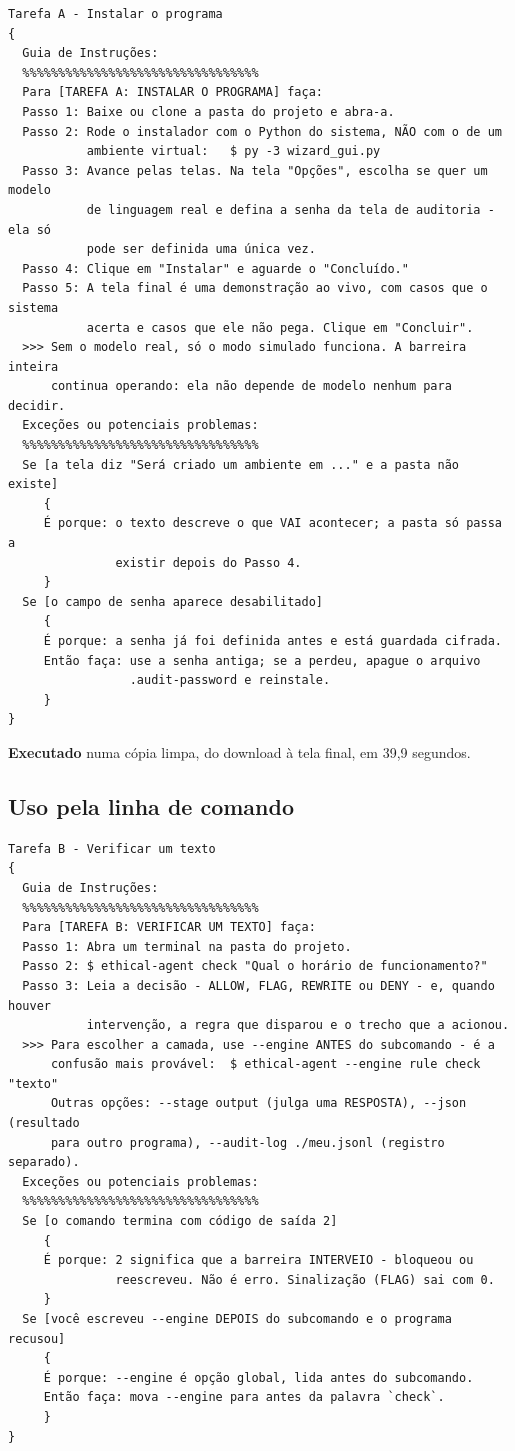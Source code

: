 \documentclass[10pt]{article}
\begin{document}
\begin{lstlisting}
Tarefa A - Instalar o programa
{
  Guia de Instruções:
  %%%%%%%%%%%%%%%%%%%%%%%%%%%%%%%%%
  Para [TAREFA A: INSTALAR O PROGRAMA] faça:
  Passo 1: Baixe ou clone a pasta do projeto e abra-a.
  Passo 2: Rode o instalador com o Python do sistema, NÃO com o de um
           ambiente virtual:   $ py -3 wizard_gui.py
  Passo 3: Avance pelas telas. Na tela "Opções", escolha se quer um modelo
           de linguagem real e defina a senha da tela de auditoria - ela só
           pode ser definida uma única vez.
  Passo 4: Clique em "Instalar" e aguarde o "Concluído."
  Passo 5: A tela final é uma demonstração ao vivo, com casos que o sistema
           acerta e casos que ele não pega. Clique em "Concluir".
  >>> Sem o modelo real, só o modo simulado funciona. A barreira inteira
      continua operando: ela não depende de modelo nenhum para decidir.
  Exceções ou potenciais problemas:
  %%%%%%%%%%%%%%%%%%%%%%%%%%%%%%%%%
  Se [a tela diz "Será criado um ambiente em ..." e a pasta não existe]
     {
     É porque: o texto descreve o que VAI acontecer; a pasta só passa a
               existir depois do Passo 4.
     }
  Se [o campo de senha aparece desabilitado]
     {
     É porque: a senha já foi definida antes e está guardada cifrada.
     Então faça: use a senha antiga; se a perdeu, apague o arquivo
                 .audit-password e reinstale.
     }
}
\end{lstlisting}

\textbf{Executado} numa cópia limpa, do download à tela final, em 39,9 segundos.

\subsection{Uso pela linha de comando}

\begin{lstlisting}
Tarefa B - Verificar um texto
{
  Guia de Instruções:
  %%%%%%%%%%%%%%%%%%%%%%%%%%%%%%%%%
  Para [TAREFA B: VERIFICAR UM TEXTO] faça:
  Passo 1: Abra um terminal na pasta do projeto.
  Passo 2: $ ethical-agent check "Qual o horário de funcionamento?"
  Passo 3: Leia a decisão - ALLOW, FLAG, REWRITE ou DENY - e, quando houver
           intervenção, a regra que disparou e o trecho que a acionou.
  >>> Para escolher a camada, use --engine ANTES do subcomando - é a
      confusão mais provável:  $ ethical-agent --engine rule check "texto"
      Outras opções: --stage output (julga uma RESPOSTA), --json (resultado
      para outro programa), --audit-log ./meu.jsonl (registro separado).
  Exceções ou potenciais problemas:
  %%%%%%%%%%%%%%%%%%%%%%%%%%%%%%%%%
  Se [o comando termina com código de saída 2]
     {
     É porque: 2 significa que a barreira INTERVEIO - bloqueou ou
               reescreveu. Não é erro. Sinalização (FLAG) sai com 0.
     }
  Se [você escreveu --engine DEPOIS do subcomando e o programa recusou]
     {
     É porque: --engine é opção global, lida antes do subcomando.
     Então faça: mova --engine para antes da palavra `check`.
     }
}

\end{lstlisting}
\end{document}
